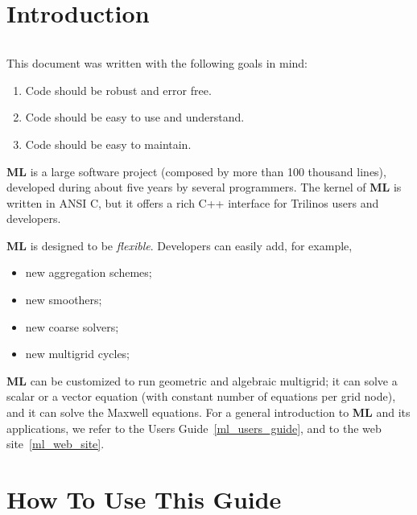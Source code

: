 \documentclass[10pt,letter,relax]{SANDreport}
\newcommand{\ML}     {{\bf ML }}
\begin{document}
\clearpage
\newpage


\section{Introduction}

\begin{verbatim}
\end{verbatim}

This document was written with the following goals in mind:
\begin{enumerate}
\item Code should be robust and error free.
\item Code should be easy to use and understand.
\item Code should be easy to maintain.
\end{enumerate}

\ML is a large software project (composed by more than 100 thousand
lines), developed during about five years by several programmers. The
kernel of \ML is written in ANSI C, but it offers a rich C++ interface
for Trilinos users and developers. 

\ML is designed to be {\sl flexible}. Developers can easily add, for example,
\begin{itemize}
\setlength{\itemsep}{-2pt}
\item new aggregation schemes;
\item new smoothers;
\item new coarse solvers;
\item new multigrid cycles;
\end{itemize}
\ML can be customized to run geometric and algebraic multigrid; it can
solve a scalar or a vector equation (with constant number of equations
per grid node), and it can solve the Maxwell equations. For a general
introduction to \ML and its applications, we refer to the Users
Guide~\ref{ml_users_guide}, and to the web site~\ref{ml_web_site}. 


\section{How To Use This Guide}
\label{sec:how}
\end{document}
